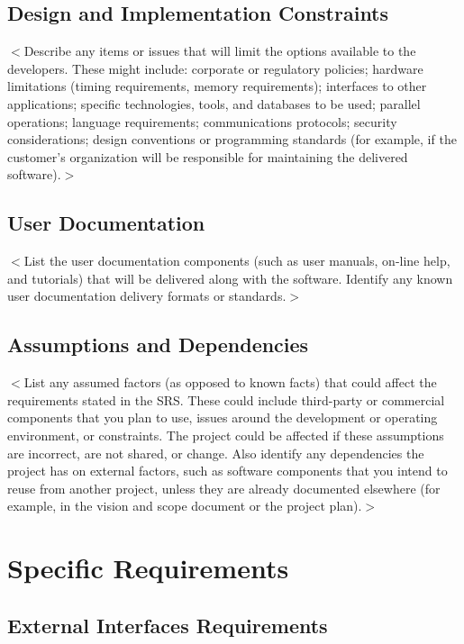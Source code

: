 \documentclass[16pt]{scrreprt}
\begin{document}
\section{Design and Implementation Constraints}
$<$Describe any items or issues that will limit the options available to the 
developers. These might include: corporate or regulatory policies; hardware 
limitations (timing requirements, memory requirements); interfaces to other 
applications; specific technologies, tools, and databases to be used; parallel 
operations; language requirements; communications protocols; security 
considerations; design conventions or programming standards (for example, if the 
customer’s organization will be responsible for maintaining the delivered 
software).$>$

\section{User Documentation}
$<$List the user documentation components (such as user manuals, on-line help, 
and tutorials) that will be delivered along with the software. Identify any 
known user documentation delivery formats or standards.$>$

\section{Assumptions and Dependencies}

$<$List any assumed factors (as opposed to known facts) that could affect the 
requirements stated in the SRS. These could include third-party or commercial 
components that you plan to use, issues around the development or operating 
environment, or constraints. The project could be affected if these assumptions 
are incorrect, are not shared, or change. Also identify any dependencies the 
project has on external factors, such as software components that you intend to 
reuse from another project, unless they are already documented elsewhere (for 
example, in the vision and scope document or the project plan).$>$


\chapter{Specific Requirements}
\label{Specific Requirements}
\section{External Interfaces Requirements}
\end{document}
